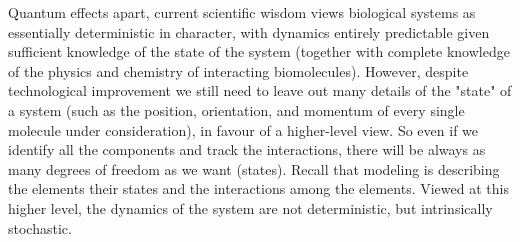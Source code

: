 \documentclass[onecollarge,runningheads]{svjour2}
\begin{document}
Quantum effects apart, current scientific wisdom views biological systems as essentially deterministic in character, with dynamics entirely predictable given sufficient knowledge of the state of the system (together with complete knowledge of the physics and chemistry of interacting biomolecules). However, despite technological improvement we still need to leave out many details of the "state" of a system (such as the position, orientation, and momentum of every single molecule under consideration), in favour of a higher-level view. So even if we identify all the components and track the interactions, there will be always as many degrees of freedom as we want (states). Recall that modeling is describing the elements their states and the interactions among the elements. Viewed at this higher level, the dynamics of the system are not deterministic, but intrinsically stochastic.
\end{document}
